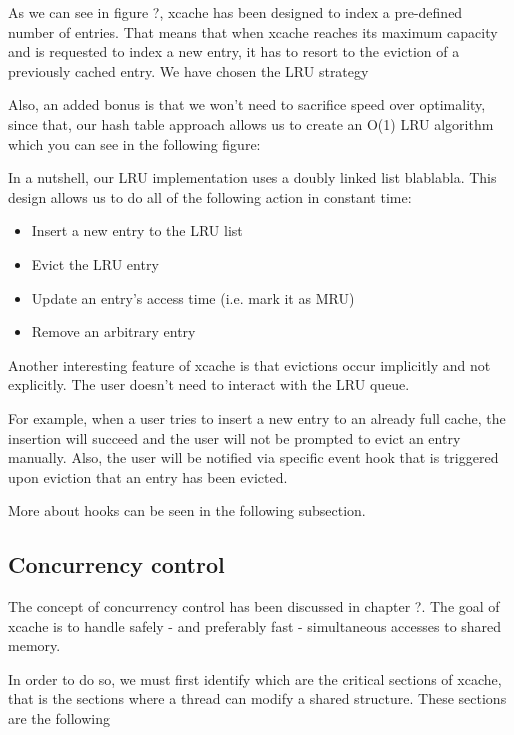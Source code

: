 As we can see in figure ?, xcache has been designed to index a pre-defined 
number of entries. That means that when xcache reaches its maximum capacity and 
is requested to index a new entry, it has to resort to the eviction of a 
previously cached entry. We have chosen the LRU strategy 

Also, an added bonus is that we won't need to sacrifice speed over optimality, 
since that, our hash table approach allows us to create an O(1) LRU algorithm 
which you can see in the following figure:


In a nutshell, our LRU implementation uses a doubly linked list blablabla.
This design allows us to do all of the following action in constant time:

\begin{itemize}
	\item Insert a new entry to the LRU list
	\item Evict the LRU entry
	\item Update an entry's access time (i.e. mark it as MRU)
	\item Remove an arbitrary entry
\end{itemize}

Another interesting feature of xcache is that evictions occur implicitly and not 
explicitly. The user doesn't need to interact with the LRU queue.

For example, when a user tries to insert a new entry to an already full cache, 
the insertion will succeed and the user will not be prompted to evict an entry 
manually. Also, the user will be notified via specific event hook that is 
triggered upon eviction that an entry has been evicted.

More about hooks can be seen in the following subsection.

\subsection{Concurrency control}

The concept of concurrency control has been discussed in chapter ?. The goal of 
xcache is to handle safely - and preferably fast - simultaneous accesses to 
shared memory.

In order to do so, we must first identify which are the critical sections of 
xcache, that is the sections where a thread can modify a shared structure. These 
sections are the following


